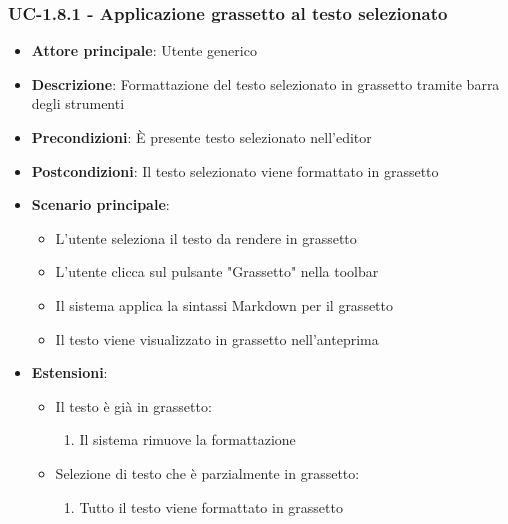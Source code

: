 \documentclass[11pt,a4paper]{article}
\begin{document}
\subsubsection{UC-1.8.1 - Applicazione grassetto al testo selezionato}
\begin{itemize}
    \item \textbf{Attore principale}: Utente generico
    \item \textbf{Descrizione}: Formattazione del testo selezionato in grassetto tramite barra degli strumenti
    \item \textbf{Precondizioni}: È presente testo selezionato nell'editor
    \item \textbf{Postcondizioni}: Il testo selezionato viene formattato in grassetto
    \item \textbf{Scenario principale}:
        \begin{itemize}
            \item L'utente seleziona il testo da rendere in grassetto
            \item L'utente clicca sul pulsante "Grassetto" nella toolbar
            \item Il sistema applica la sintassi Markdown per il grassetto
            \item Il testo viene visualizzato in grassetto nell'anteprima
        \end{itemize}
    \item \textbf{Estensioni}:
        \begin{itemize}
            \item Il testo è già in grassetto:
                \begin{enumerate}
                    \item Il sistema rimuove la formattazione
                \end{enumerate}
            \item Selezione di testo che è parzialmente in grassetto:
                \begin{enumerate}
                    \item Tutto il testo viene formattato in grassetto
                \end{enumerate}
        \end{itemize}
\end{itemize}
\end{document}
